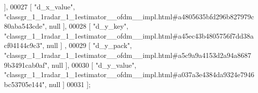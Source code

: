 \begin{DoxyCode}
      ],
00027     [ \textcolor{stringliteral}{"d\_x\_value"}, \textcolor{stringliteral}{"classgr\_1\_1radar\_1\_1estimator\_\_ofdm\_\_impl.html#a4805635bfd296b827979c80aba543cde"}, null
       ],
00028     [ \textcolor{stringliteral}{"d\_y\_key"}, \textcolor{stringliteral}{"classgr\_1\_1radar\_1\_1estimator\_\_ofdm\_\_impl.html#a45ec43b4805756f7dd38acf04144c9c3"}, null ]
      ,
00029     [ \textcolor{stringliteral}{"d\_y\_pack"}, \textcolor{stringliteral}{"classgr\_1\_1radar\_1\_1estimator\_\_ofdm\_\_impl.html#a5c9a9a4153d2a94a86879b3491cab0af"}, null 
      ],
00030     [ \textcolor{stringliteral}{"d\_y\_value"}, \textcolor{stringliteral}{"classgr\_1\_1radar\_1\_1estimator\_\_ofdm\_\_impl.html#a037a3e4384da9324e7946bc53705e144"}, null
       ]
00031 ];
\end{DoxyCode}
